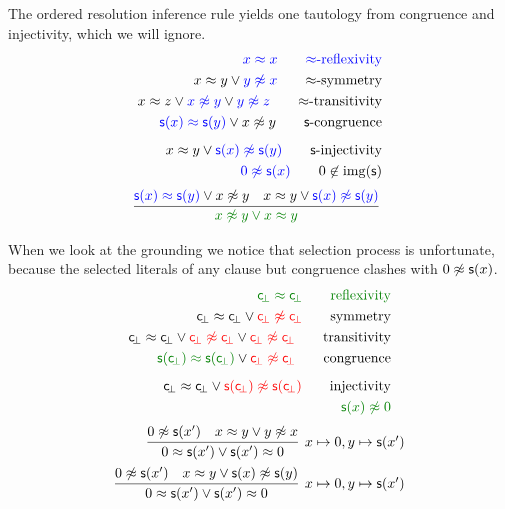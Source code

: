 \begin{example} The ordered resolution inference rule yields one tautology from congruence and injectivity,
	which we will ignore.
	\begin{align*}
	\colN x \mEQ x
	\tag*{$\mEQ$-reflexivity}\\
	x \mEQ y \lor {\colN y \mNE x}
	\tag*{$\mEQ$-symmetry}\\
	x \mEQ z \lor {\colN x \mNE y} \lor {\colN y\mNE z}
	\tag*{$\mEQ$-transitivity}\\
	{\colN \msucc(x) \mEQ \msucc(y)} \lor x\mNE y
	\tag*{$\msucc$-congruence}\\[0.5em]
	x \mEQ y \lor {\colN \msucc(x) \mNE \msucc(y)}
	\tag*{$\msucc$-injectivity}\\
	{\colN 0 \mNE \msucc(x)}
	\tag*{$0\not\in\img(\msucc)$}
	\end{align*}
	\begin{align*}
	\infer[]
	{\colHi x\mNE y\lor x\mEQ y}
	{
		{\colN \msucc(x) \mEQ \msucc(y)} \lor x\mNE y 
		&
		x \mEQ y \lor {\colN \msucc(x) \mNE \msucc(y)}
	}
	\end{align*}
\end{example}

\begin{example}\label{ex:nat:instgen}
	 When we look at the grounding we notice that selection process is unfortunate,
	because the selected literals of any clause but congruence clashes with $0\not\approx{\mathsf s}(x)$.
	\begin{align*}
	\colHi \consbot \mEQ \consbot
	\tag*{reflexivity}\\
	{ \consbot \mEQ \consbot} \lor {\colLo \consbot \mNE \consbot}
	\tag*{symmetry}\\
	{ \consbot \mEQ \consbot} 
	\lor {\colLo \consbot \mNE \consbot} 
	\lor {\colLo \consbot\mNE \consbot}
	\tag*{transitivity}\\
	{\colHi \msucc(\consbot) \mEQ \msucc(\consbot)} \lor {\colLo \consbot \mNE \consbot}
	\tag*{congruence}\\[0.5em]
	{ \consbot \mEQ \consbot} \lor {\colLo \msucc(\consbot) \mNE \msucc(\consbot)}
	\tag*{injectivity}\\
	{\colHi \msucc(x) \mNE 0}
	\end{align*}
	\begin{align*}
	\infer[x\mapsto 0, y\mapsto \msucc(x') ]
	{ 0\mEQ\msucc(x')\lor \msucc(x')\mEQ 0}
	{
		0 \mNE\msucc(x')
		&
		x\mEQ y\lor y\mNE x
	}
\\
%
\infer[x\mapsto 0, y\mapsto \msucc(x') ]
{ 0\mEQ\msucc(x')\lor \msucc(x')\mEQ 0}
{
	0 \mNE \msucc(x')
	&
	x \mEQ y \lor \msucc(x)\mNE \msucc(y)	
}
	\end{align*}
\end{example}

